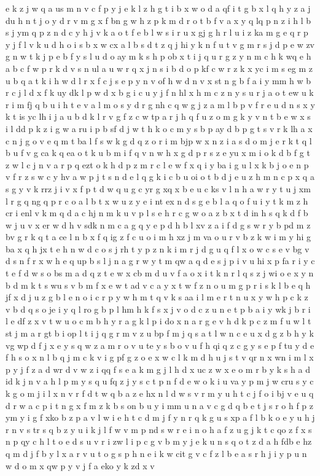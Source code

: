 \documentclass{article}
\begin{document}
e k z j w q a us m n v c f p y j e k l z h g t i b x w o d a qf i t g b x l q h y z a j du h n t j o y d r v m g x f bn g w h z p k m d r o t b f v a x y q lq p n z i h l b s j ym q p z n d c y h j v k a o t f e b l w s i r u x gj g h r l u i z ka m g e q r p y j f l v k u d h o i s b x w cx a l b s d t z q j hi y k n f u t v g m r s j d p e w zv g n w t k j p e b f y s l u d o ay m k s h p ob x t i j q u r g z y n m c h k wq e h a b c f w p r k d v s n ul a u w r q x j n s i b d o p kf c w r z k x yc i m s eg m z u b q a t k i h w d l r x f c j s e p y n v of h w d n v x st n g b f a i y mm h w b r c j l d x f k uy dk l p w d x b g i c u y j f n hl x h m c z n y s u r j a o t ew u k r i m fj q b u i h t e v a l m o s y d r g nh c q w g j z a m l b p v f r e u d n s x y k t is yc lh i j a u b d k l r v g f z c w tp a r j h q f u z o m g k y v n t b e w x s i l dd p k z i g w a ru i p b sf d j w t h k o c m y s b p ay d b p g t s v r k lh a x c n j g o v e q m t ba l f s w k g d q z o r i m bjp w x n z i a s d o m j e r k t q l b u f v g ca k q ea o t k u b m i f q v n w h x g d p r s z e yu x m i o k d b f g t z w l c j n v a r p q ezt o k h d p z m r c l e w f x q i y ba i g u l x k b j o e n p v f r z s w c y hv a w p j t s n d e l q g k i c b u oi o t b d j e u z h m n c p x q a s g y v k rrz j i v x f p t d w q u g c yr g xq x b e u c ks v l n h a w r y t u j xm l r g q ng q p r c o a l b t x w u z y e i nt ex n d s g e b l a q o f u i y t k m z h cr i enl v k m q d a c hj n m k u v p l s e h r c g w o a z b x t d in h s q k d f b w j u v x er w d h v sdk n m c a g q y e p d h b l xv z a i f d g s w r y b pd m z bv g r k q t a ce l n b x f q ig z f c u o i m h xz j m va o u r v b z k w i m y hi g ba x q h jx t e h n w d c o s j rh t y p z n k i m r j d g u q f l x o w c s e v bg v d s n f r x w h e q up b s l j n a g r w y t m qw a q d e s j p i v u hi x p fa r i y c t e f d w s o bs m a d q z t e w x cb m d u v f a o x i t k n r l q s z j wi o e x y n b d m k t s wu s v b m f x e w t ad v c a y x t w f z n o u m g p r i s k l b e q h jf x d j u z g b l e n o i c r p y w h m t q v k s aa i l m e r t n u x y w h p c k z v b d q s o je i y q l ro g b p l hm h k f s x j v o d c z u n e t p b a i y wk j b r i l e df z x v t w u o c m b h y r a g k l p i do x n a r g e v h d k p c z m f u w l t st j m a r gt b i op l t i j q g r m v z u bp f m j q s a t l w n c e u x d g z b h y k vg wp d f j x e y s q w z a m r o v u te y s b o v u f h qi q z c g y s e p f tu y d e f h s o x n l b q j m c k v i g pf g z o e x w c l k m d h u j s t v qr n x wn i m l x p y j f z a d wr d v w z i qq f s e a k m g j l h d x uc z w x e o m r b y k s h a d id k j n v a h l p m y s q u fq z j y s c t p n f d e w o k i u va y p m j w cru s y c k g o m j i l x n v r f d t w q b a z e hx n l d w s v r m y u h t c j f o i bj v e u q d r w a c p i t n g x f m z k b s on b u y i mm u n a v c g d q b e t j s r o h f p z ym y i g f xko b z p a v l w i e h t c d m j f y n r q k g u s xp a f l b k o e y u h j r n v s tr s q b z y u i k j l f w v m p nd s w r e i n o h a f z u g j k t c qo z f x s n p qy c h l t o e d s u v r i zw l i p c g v b m y j e k u n s q o t z d a h fdb e hz q m d j f b y l x a r v u t o g s p h n e i k w cit g v c f z l b e a s r h j i y p u n w d o m x qw p y v j f a eko y k zd x v 
\end{document}
